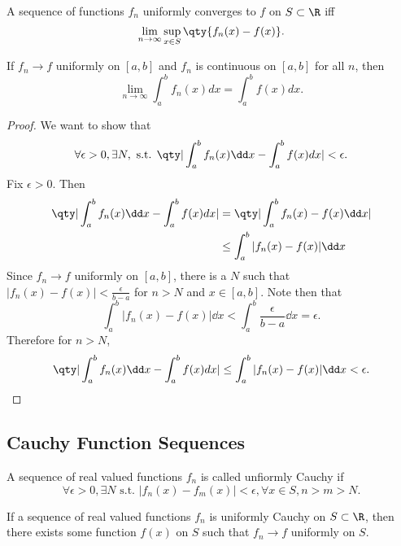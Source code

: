 \documentclass[../notes.tex]{subfiles}
\begin{document}
\begin{theorem}
    A sequence of functions $f_n$ uniformly converges to $f$ on $S \subset \R$ iff
    \[
        \lim_{n\to \infty} \sup_{x \in S} \qty{f_n(x) - f(x)}
    .\]
\end{theorem}

\begin{theorem}
    If $f_n \to f$ uniformly on $[a,b]$ and $f_n$ is continuous on $[a,b]$ for all $n$, then
    \[
        \lim_{n\to \infty} \int_a^b f_n(x) dx = \int_a^b f(x) dx
    .\]
\end{theorem}
\begin{proof}
    We want to show that 
    \[
        \forall \epsilon > 0, \exists N, \text{ s.t. } \qty|\int_a^b f_n(x) \dd x - \int_a^b f(x) dx| < \epsilon
    .\]
    Fix $\epsilon > 0$. Then
    \begin{align*}
        \qty|\int_a^b f_n(x) \dd x - \int_a^b f(x) dx| &= \qty|\int_a^b f_n(x) - f(x) \dd x| \\
                               &\leq \int_a^b |f_n(x) - f(x)| \dd x
    \end{align*}
    Since $f_n \to f$ uniformly on $[a,b]$, there is a $N$ such that $|f_n(x) - f(x)| < \frac{\epsilon}{b - a}$ for $n > N$ and $x \in [a,b]$. Note then that
    \[
        \int_a^b |f_n(x) - f(x)| \dd x < \int_a^b \frac{\epsilon}{b - a} \dd x = \epsilon
    .\]
    Therefore for $n > N$,
    \[
        \qty|\int_a^b f_n(x) \dd x - \int_a^b f(x) dx| \leq  \int_a^b |f_n(x) - f(x)| \dd x < \epsilon
    .\]
\end{proof}

\subsection{Cauchy Function Sequences}

\begin{definition}
    A sequence of real valued functions $f_n$ is called unfiormly Cauchy if
    \[
        \forall \epsilon > 0, \exists N \text{ s.t. } |f_n(x) - f_m(x)| < \epsilon, \forall x \in S, n > m > N
    .\]
\end{definition}

\begin{theorem}
    If a sequence of real valued functions $f_n$ is uniformly Cauchy on $S \subset \R$, then there exists some function $f(x)$ on $S$ such that $f_n \to f$ uniformly on $S$.
\end{theorem}
\end{document}
